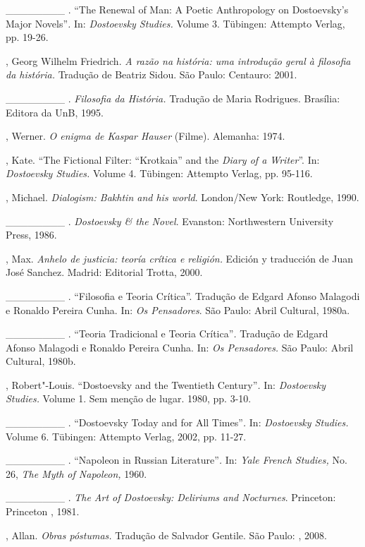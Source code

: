 \begin{Parskip}
\_\_\_\_\_\_\_\_ . ``The Renewal of Man: A Poetic Anthropology on
Dostoevsky's Major Novels''\emph{.} In: \emph{Dostoevsky Studies.}
Volume 3. Tübingen: Attempto Verlag, pp. 19-26.

, Georg Wilhelm Friedrich. \emph{A razão na história: uma
introdução geral à filosofia da história.} Tradução de Beatriz Sidou.
São Paulo: Centauro: 2001.

\_\_\_\_\_\_\_\_ . \emph{Filosofia da História.} Tradução de Maria
Rodrigues. Brasília: Editora da UnB, 1995.

, Werner. \emph{O enigma de Kaspar Hauser} (Filme). Alemanha:
1974.

, Kate. ``The Fictional Filter: ``Krotkaia'' and the \emph{Diary
of a Writer}''. In: \emph{Dostoevsky Studies.} Volume 4. Tübingen:
Attempto Verlag, pp. 95-116.

, Michael. \emph{Dialogism: Bakhtin and his world}. London/New
York: Routledge, 1990.

\_\_\_\_\_\_\_\_ . \emph{Dostoevsky \& the Novel}. Evanston:
Northwestern University Press, 1986.

, Max. \emph{Anhelo de justicia: teoría crítica e religión.}
Edición y traducción de Juan José Sanchez. Madrid: Editorial Trotta,
2000.

\_\_\_\_\_\_\_\_ . ``Filosofia e Teoria Crítica''. Tradução de Edgard
Afonso Malagodi e Ronaldo Pereira Cunha. In: \emph{Os Pensadores}. São
Paulo: Abril Cultural, 1980a.

\_\_\_\_\_\_\_\_ . ``Teoria Tradicional e Teoria Crítica''\emph{.}
Tradução de Edgard Afonso Malagodi e Ronaldo Pereira Cunha. In: \emph{Os
Pensadores.} São Paulo: Abril Cultural, 1980b.

, Robert"-Louis. ``Dostoevsky and the Twentieth Century''\emph{.}
In: \emph{Dostoevsky Studies.} Volume 1. Sem menção de lugar. 1980, pp.
3-10.

\_\_\_\_\_\_\_\_ . ``Dostoevsky Today and for All Times''\emph{.} In:
\emph{Dostoevsky Studies.} Volume 6. Tübingen: Attempto Verlag, 2002,
pp. 11-27.

\_\_\_\_\_\_\_\_ . ``Napoleon in Russian Literature''\emph{.} In:
\emph{Yale French Studies,} No. 26, \emph{The Myth of Napoleon,} 1960.

\_\_\_\_\_\_\_\_ . \emph{The Art of Dostoevsky: Deliriums and
Nocturnes}. Princeton: Princeton , 1981.

, Allan. \emph{Obras póstumas.} Tradução de Salvador Gentile. São
Paulo: , 2008.


\end{Parskip}

